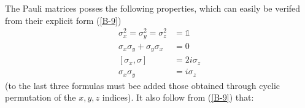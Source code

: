 The Pauli matrices posses the following properties, which can easily be verifed from their explicit form (\ref{B-9})
\begin{align}
	\label{B-10a}\sigma_x^2=\sigma_y^2=\sigma_z^2&=\mathbb{1}\\
	\label{B-10b}\sigma_x\sigma_y + \sigma_y\sigma_x&=0\\
	\label{B-10c}[\sigma_x,\sigma]&=2i\sigma_z\\
	\sigma_x\sigma_y&=i\sigma_z\label{B-10d}
\end{align}
(to the last three formulas must bee added those obtained through cyclic permutation of the $x,y,z$ indices). It also follow from (\ref{B-9}) that:






